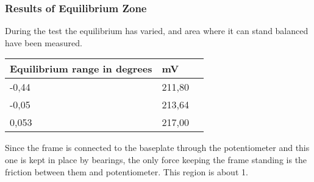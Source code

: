\subsubsection{Results of Equilibrium Zone}
During the test the equilibrium has varied, and area where it can stand balanced have been measured. 

\begin{table}[H]
	\centering
	\begin{tabular}{|l|l|p{4.3cm}|}
		\hline%
		\textbf{Equilibrium range in degrees}       &  \textbf{mV}         \\
		\hline%
		-0,44                               			  & 211,80               \\
		\hline%
		-0,05                                          & 213,64               \\
		\hline%
		0,053 										  & 217,00              \\
		\hline%
	\end{tabular}
\end{table}


Since the frame is connected to the baseplate through the potentiometer and this one is kept in place by bearings, the only force keeping the frame standing is the friction between them and potentiometer. This region is about \si{1^{\circ}}.



